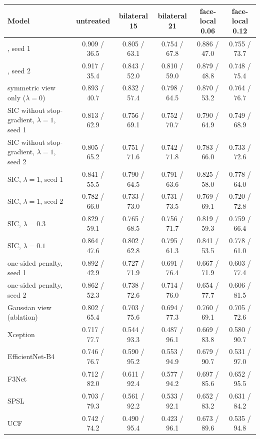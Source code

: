 \begin{tabular}{@{}l ccccc@{}}
\toprule
Model & untreated & bilateral 15 & bilateral 21 & face-local 0.06 & face-local 0.12 \\
\midrule
\oursB{}, seed 1 & 0.909 / 36.5 & 0.805 / 63.1 & 0.754 / 67.8 & 0.886 / 47.0 & 0.755 / 73.7 \\
\oursB{}, seed 2 & 0.917 / 35.4 & 0.843 / 52.0 & 0.810 / 59.0 & 0.879 / 48.8 & 0.748 / 75.4 \\
symmetric view only ($\lambda=0$) & 0.893 / 40.7 & 0.832 / 57.4 & 0.798 / 64.5 & 0.870 / 53.2 & 0.764 / 76.7 \\
SIC without stop-gradient, $\lambda=1$, seed 1 & 0.813 / 62.9 & 0.756 / 69.1 & 0.752 / 70.7 & 0.790 / 64.9 & 0.749 / 68.9 \\
SIC without stop-gradient, $\lambda=1$, seed 2 & 0.805 / 65.2 & 0.751 / 71.6 & 0.742 / 71.8 & 0.783 / 66.0 & 0.733 / 72.6 \\
SIC, $\lambda=1$, seed 1 & 0.841 / 55.5 & 0.790 / 64.5 & 0.791 / 63.6 & 0.825 / 58.0 & 0.778 / 64.0 \\
SIC, $\lambda=1$, seed 2 & 0.782 / 66.0 & 0.733 / 73.0 & 0.731 / 73.5 & 0.769 / 69.1 & 0.720 / 72.8 \\
SIC, $\lambda=0.3$ & 0.829 / 59.1 & 0.765 / 68.5 & 0.756 / 71.7 & 0.819 / 59.3 & 0.759 / 66.4 \\
SIC, $\lambda=0.1$ & 0.864 / 47.6 & 0.802 / 62.8 & 0.795 / 61.3 & 0.841 / 53.5 & 0.778 / 61.0 \\
one-sided penalty, seed 1 & 0.892 / 42.9 & 0.727 / 71.9 & 0.691 / 76.4 & 0.667 / 71.9 & 0.603 / 77.4 \\
one-sided penalty, seed 2 & 0.862 / 52.3 & 0.738 / 72.6 & 0.714 / 76.0 & 0.654 / 77.7 & 0.606 / 81.5 \\
Gaussian view (ablation) & 0.802 / 65.4 & 0.703 / 75.6 & 0.694 / 77.3 & 0.760 / 69.1 & 0.705 / 72.6 \\
Xception & 0.717 / 77.7 & 0.544 / 93.3 & 0.487 / 96.1 & 0.669 / 83.8 & 0.580 / 90.7 \\
EfficientNet-B4 & 0.746 / 76.7 & 0.590 / 95.2 & 0.553 / 94.9 & 0.679 / 90.7 & 0.531 / 97.0 \\
F3Net & 0.712 / 82.0 & 0.611 / 92.4 & 0.577 / 94.2 & 0.697 / 85.6 & 0.652 / 95.5 \\
SPSL & 0.703 / 79.3 & 0.561 / 92.2 & 0.533 / 92.1 & 0.652 / 83.2 & 0.631 / 84.2 \\
UCF & 0.742 / 74.2 & 0.490 / 95.4 & 0.423 / 96.1 & 0.673 / 89.6 & 0.535 / 94.8 \\

\end{tabular}
